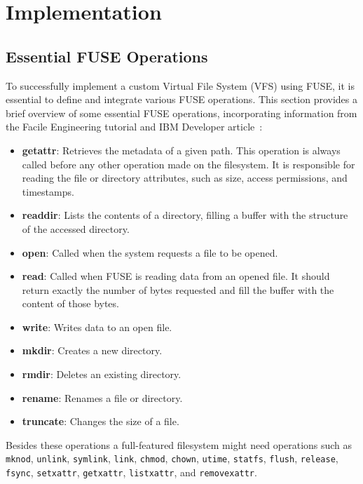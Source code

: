 \chapter{Implementation}
\label{chap:implementation}


\section{Essential FUSE Operations}\label{sec:fuse-ops}

To successfully implement a custom Virtual File System (VFS) using FUSE, it is essential to define and integrate various FUSE operations.
This section provides a brief overview of some essential FUSE operations, incorporating information from the Facile Engineering tutorial and IBM Developer article~\cite{ibm_fuse, facile_fuse}:

\begin{itemize}
    \item \textbf{getattr}: Retrieves the metadata of a given path.
    This operation is always called before any other operation made on the filesystem.
    It is responsible for reading the file or directory attributes, such as size, access permissions, and timestamps.
    \item \textbf{readdir}: Lists the contents of a directory, filling a buffer with the structure of the accessed directory.
    \item \textbf{open}: Called when the system requests a file to be opened.
    \item \textbf{read}: Called when FUSE is reading data from an opened file.
    It should return exactly the number of bytes requested and fill the buffer with the content of those bytes.
    \item \textbf{write}: Writes data to an open file.
    \item \textbf{mkdir}: Creates a new directory.
    \item \textbf{rmdir}: Deletes an existing directory.
    \item \textbf{rename}: Renames a file or directory.
    \item \textbf{truncate}: Changes the size of a file.
\end{itemize}

Besides these operations a full-featured filesystem might need operations such as \texttt{mknod}, \texttt{unlink}, \texttt{symlink}, \texttt{link}, \texttt{chmod}, \texttt{chown}, \texttt{utime}, \texttt{statfs}, \texttt{flush}, \texttt{release}, \texttt{fsync}, \texttt{setxattr}, \texttt{getxattr}, \texttt{listxattr}, and \texttt{removexattr}.

